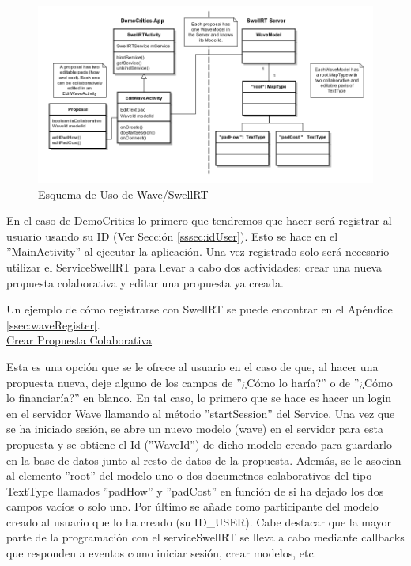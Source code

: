 	\begin{figure}[H]
	  \centering
	    \includegraphics[keepaspectratio, scale=0.5]{Media/Diagrams/collaborativeProposalDiagram.png}
	  \caption{Esquema de Uso de Wave/SwellRT}
	  \label{fig:diagramUseSwellRT}
	\end{figure}	
			
		En el caso de DemoCritics lo primero que tendremos que hacer será registrar al usuario usando su ID (Ver Sección \ref{sssec:idUser}). Esto se hace en el ''MainActivity'' al ejecutar la aplicación.  Una vez registrado solo será necesario utilizar el ServiceSwellRT para llevar a cabo dos actividades: crear una nueva propuesta colaborativa y editar una propuesta ya creada. 
		
		Un ejemplo de cómo registrarse con SwellRT se puede encontrar en el Apéndice \ref{ssec:waveRegister}. \\

		\underline{Crear Propuesta Colaborativa}
		
		Esta es una opción que se le ofrece al usuario en el caso de que, al hacer una propuesta nueva, deje alguno de los campos de ''¿Cómo lo haría?'' o de ''¿Cómo lo financiaría?'' en blanco. En tal caso, lo primero que se hace es hacer un login en el servidor Wave llamando al método ''startSession'' del Service. Una vez que se ha iniciado sesión, se abre un nuevo modelo (wave) en el servidor para esta propuesta y se obtiene el Id (''WaveId'') de dicho modelo creado para guardarlo en la base de datos junto al resto de datos de la propuesta. Además, se le asocian al elemento ''root'' del modelo uno o dos documetnos colaborativos del tipo TextType llamados ''padHow'' y ''padCost'' en función de si ha dejado los dos campos vacíos o solo uno. Por último se añade como participante del modelo creado al usuario que lo ha creado (su ID\_USER). Cabe destacar que la mayor parte de la programación con el serviceSwellRT se lleva a cabo mediante callbacks que responden a eventos como iniciar sesión, crear modelos, etc.
		
